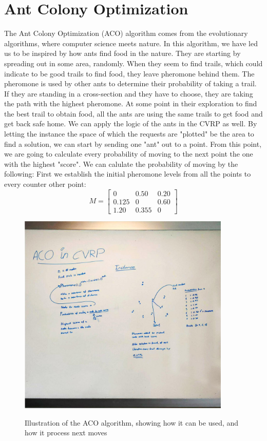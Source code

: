 \documentclass[12pt]{article}
\begin{document}
\section{Ant Colony Optimization}
The Ant Colony Optimization (ACO) algorithm comes from the evolutionary algorithms, where computer science meets nature. In this algorithm, 
we have led us to be inspired by how ants find food in the nature. They are starting by spreading out in some area, randomly. When they seem to find trails, 
which could indicate to be good trails to find food, they leave pheromone behind them. The pheromone is used by other ants to determine their probability of taking 
a trail. If they are standing in a cross-section and they have to choose, they are taking the path with the highest pheromone. 
At some point in their exploration to find the best trail to obtain food, all the ants are using the same trails to get food and get back safe home. 
\newline
We can apply the logic of the ants in the CVRP as well. By letting the instance \- the space of which the requests are "plotted" \- be the area to find a solution, 
we can start by sending one "ant" out to a point. From this point, we are going to calculate every probability of moving to the next point \- the one with the highest "score". 
We can calulate the probability of moving by the following: 
\newline
First we establish the initial pheromone levels from all the points to every counter other point: \\
\[
    M = \begin{bmatrix}
        0     & 0.50  & 0.20 \\[0.3em]
        0.125 & 0     & 0.60 \\[0.3em]
        1.20  & 0.355 & 0
    \end{bmatrix}
\]
\begin{figure}[H]
    \caption{Illustration of the ACO algorithm, showing how it can be used, and how it process next moves}
    \centering
    \includegraphics[width=0.9\textwidth]{ACO_Whiteboard.jpg}
    \label{fig:acowhiteboard}
    
\end{figure}
\end{document}
